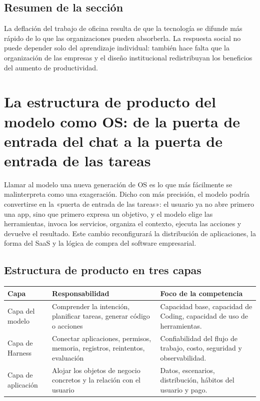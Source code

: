 \documentclass[a4paper]{article}
\begin{document}
\subsection{Resumen de la sección}

La deflación del trabajo de oficina resulta de que la tecnología se difunde más rápido de lo que las organizaciones pueden absorberla. La respuesta social no puede depender solo del aprendizaje individual: también hace falta que la organización de las empresas y el diseño institucional redistribuyan los beneficios del aumento de productividad.
\section{La estructura de producto del modelo como OS: de la puerta de entrada del chat a la puerta de entrada de las tareas}

Llamar al modelo una nueva generación de OS es lo que más fácilmente se malinterpreta como una exageración. Dicho con más precisión, el modelo podría convertirse en la «puerta de entrada de las tareas»: el usuario ya no abre primero una app, sino que primero expresa un objetivo, y el modelo elige las herramientas, invoca los servicios, organiza el contexto, ejecuta las acciones y devuelve el resultado. Este cambio reconfigurará la distribución de aplicaciones, la forma del SaaS y la lógica de compra del software empresarial.

\subsection{Estructura de producto en tres capas}

\noindent\begin{longtable}{p{}p{}p{}}
\toprule
Capa & Responsabilidad & Foco de la competencia \\
\midrule
Capa del modelo & Comprender la intención, planificar tareas, generar código o acciones & Capacidad base, capacidad de Coding, capacidad de uso de herramientas. \\
Capa de Harness & Conectar aplicaciones, permisos, memoria, registros, reintentos, evaluación & Confiabilidad del flujo de trabajo, costo, seguridad y observabilidad. \\
Capa de aplicación & Alojar los objetos de negocio concretos y la relación con el usuario & Datos, escenarios, distribución, hábitos del usuario y pago. \\
\bottomrule
\end{longtable}
\end{document}
